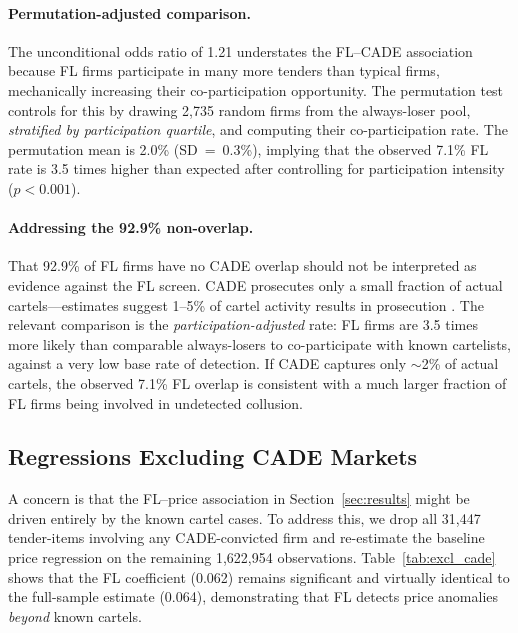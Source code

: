 \paragraph{Permutation-adjusted comparison.}
The unconditional odds ratio of 1.21 understates the FL--CADE
association because FL firms participate in many more tenders than
typical firms, mechanically increasing their co-participation
opportunity. The permutation test controls for this by drawing 2,735
random firms from the always-loser pool, \emph{stratified by
participation quartile}, and computing their co-participation rate. The
permutation mean is 2.0\% (SD~=~0.3\%), implying that the observed
7.1\% FL rate is 3.5 times higher than expected after controlling for
participation intensity ($p < 0.001$).

\paragraph{Addressing the 92.9\% non-overlap.}
That 92.9\% of FL firms have no CADE overlap should not be interpreted
as evidence against the FL screen. CADE prosecutes only a small fraction
of actual cartels---estimates suggest 1--5\% of cartel activity
results in prosecution \citep{connor2007price}. The relevant comparison
is the \emph{participation-adjusted} rate: FL firms are 3.5 times more
likely than comparable always-losers to co-participate with known
cartelists, against a very low base rate of detection. If CADE captures
only $\sim$2\% of actual cartels, the observed 7.1\% FL overlap is
consistent with a much larger fraction of FL firms being involved in
undetected collusion.

\subsection{Regressions Excluding CADE Markets}

A concern is that the FL--price association in Section~\ref{sec:results}
might be driven entirely by the known cartel cases. To address this, we
drop all 31,447 tender-items involving any CADE-convicted firm and
re-estimate the baseline price regression on the remaining 1,622,954
observations. Table~\ref{tab:excl_cade} shows that the FL coefficient
(0.062) remains significant and virtually identical to the full-sample
estimate (0.064), demonstrating that FL detects price anomalies
\emph{beyond} known cartels.


